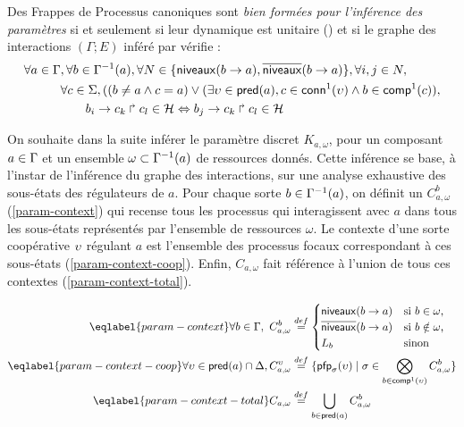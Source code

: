 \begin{property}
  Des Frappes de Processus canoniques sont \emph{bien formées pour l'inférence des paramètres}
  si et seulement si leur dynamique est unitaire ()
  et si le graphe des interactions $(\Gamma; E)$ inféré par 
  vérifie :
  \begin{align*}
    \begin{split}
      \forall a \in \Gamma &, \forall b \in \Gamma^{-1}(a),
        \forall N \in \{ \mathsf{niveaux}(b\rightarrow a), \overline{\mathsf{niveaux}}(b\rightarrow a) \}, \forall i,j \in N, \\
      & \forall c \in \Sigma, ( (b \neq a \wedge c = a) \vee
        (\exists \upsilon \in \mathsf{pred}(a), c \in \mathsf{conn}^1(\upsilon) \wedge b \in \mathsf{comp}^1(c)), \\
      & \qquad b_i\rightarrow c_k\Rsh c_l\in\mathcal{H} \Leftrightarrow b_j\rightarrow c_k\Rsh c_l\in\mathcal{H}
    \end{split}
  \end{align*}
\end{property}

On souhaite dans la suite inférer le paramètre discret $K_{a,\omega}$,
pour un composant $a \in \mathrm{\Gamma}$ et un ensemble $\omega \subset \Gamma^{-1}(a)$
de ressources donnés.
Cette inférence se base, à l'instar de l'inférence du graphe des interactions, sur une analyse
exhaustive des sous-états des régulateurs de $a$.
Pour chaque sorte $b \in \Gamma^{-1}(a)$, on définit un  $C^b_{a,\omega}$
(\eqref{param-context}) qui recense tous les processus qui interagissent avec $a$
dans tous les sous-états représentés par l'ensemble de ressources $\omega$.
Le contexte d'une sorte coopérative $\upsilon$ régulant $a$ est l'ensemble des processus
focaux correspondant à ces sous-états (\eqref{param-context-coop}).
Enfin, $C_{a,\omega}$ fait référence à l'union de tous ces contextes
(\eqref{param-context-total}).

\begin{align}
\eqlabel{param-context}
  \forall b \in \Gamma,~
  C_{a,\omega}^b & \DEF \begin{cases}
    \levels{b}{a}  & \text{si $b \in \omega$,}\\
    \ulevels{b}{a} & \text{si $b \notin \omega$,}\\
    L_b            & \text{sinon}\\
  \end{cases}
  \\
\eqlabel{param-context-coop}
  \forall \myupsilon \in \pred(a) \cap \cs,
    C_{a,\omega}^\myupsilon & \DEF \{ \pfp_{\sigma}(\myupsilon) \mid
    \sigma \in \bigtimes{b \in \compin(\myupsilon)} C_{a,\omega}^b \} \\
\eqlabel{param-context-total}
  C_{a,\omega} & \DEF \bigcup_{b \in \pred(a)} C^b_{a,\omega}
\end{align}

